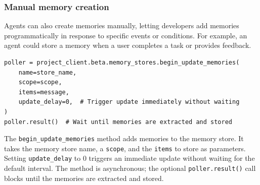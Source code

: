 \documentclass[9pt]{extarticle}%
\begin{document}
\subsubsection{Manual memory creation}%
Agents can also create memories manually, letting developers add memories programmatically in response to specific events or conditions. For example, an agent could store a memory when a user completes a task or provides feedback.
%
\par\vspace{\baselineskip}%
{\small
\begin{verbatim}
poller = project_client.beta.memory_stores.begin_update_memories(
    name=store_name,
    scope=scope,
    items=message,
    update_delay=0,  # Trigger update immediately without waiting
)
poller.result()  # Wait until memories are extracted and stored

\end{verbatim}}%
\vspace{\baselineskip}%
The \texttt{begin\_update\_memories} method adds memories to the memory store. It takes the memory store name, a \texttt{scope}, and the \texttt{items} to store as parameters. Setting \texttt{update\_delay} to 0 triggers an immediate update without waiting for the default interval. The method is asynchronous; the optional \texttt{poller.result()} call blocks until the memories are extracted and stored.
%
\par\vspace{\baselineskip}%
\end{document}
